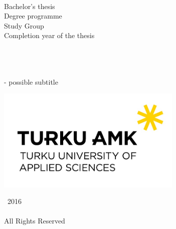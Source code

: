 
\thispagestyle{empty}
\begingroup
\noindent
{}
\\
Bachelor's thesis
\\[0.5em]
Degree programme
\\[0.5em]
Study Group
\\[0.5em]
Completion year of the thesis
\\[0.5em]
\endgroup 

\begingroup
\flushleft
{}
~
\\[5em]
\setlength{\leftskip}{2.25cm}\AuthorName
\\[0.35cm]
\sffamily\fontsize{24}{28.8}\selectfont
\MakeUppercase{\DocumentTitle}
\\[0.35cm]
\sffamily\fontsize{16}{19.2}\selectfont
- possible subtitle
\\
\normalfont\large

\vfill
\centering
\includegraphics[height=4.93cm]
{Figure-TUAS}
\par
\endgroup

\clearpage


\pagestyle{plain}
\setcounter{page}{2}

\begingroup
\centering
{}
\null
\vfill
{\sffamily\textcopyright}~2016
\\[0.5em]
\AuthorName
\\[0.5em]
All Rights Reserved
\par
\endgroup

\clearpage


